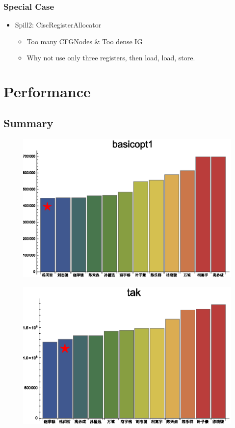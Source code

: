 \documentclass{beamer}
\begin{document}
\begin{frame}\frametitle{Special Case}
	\begin{itemize}
		\item Spill2: CiscRegisterAllocator
			\begin{itemize}
				\item Too many CFGNodes \& Too dense IG
				\item Why not use only three registers, then load, load, store.
			\end{itemize}
	\end{itemize}	
\end{frame}

\section{Performance}
\subsection{Summary}
\begin{frame}
	\begin{figure}
		\centering
		\includegraphics[width = \textwidth]{cr_2}
	\end{figure}
\end{frame}

\begin{frame}
	\begin{figure}
		\centering
		\includegraphics[width = \textwidth]{cr_9}
	\end{figure}
\end{frame}
\end{document}

